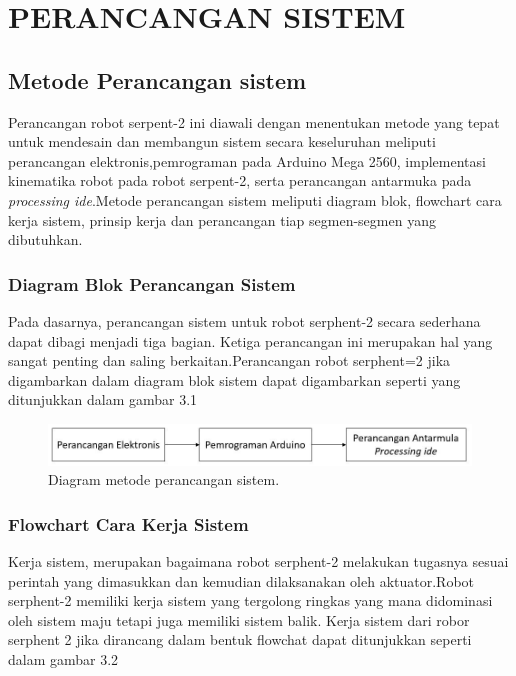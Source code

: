
\chapter{PERANCANGAN SISTEM}

\section{Metode Perancangan sistem}
Perancangan robot serpent-2 ini diawali dengan menentukan metode yang tepat untuk mendesain dan membangun sistem secara keseluruhan meliputi perancangan elektronis,pemrograman pada Arduino Mega 2560, implementasi kinematika robot pada robot serpent-2, serta perancangan antarmuka pada \emph {processing ide}.Metode perancangan sistem meliputi diagram blok, flowchart cara kerja sistem, prinsip kerja dan perancangan tiap segmen-segmen yang dibutuhkan.
\subsection{Diagram Blok Perancangan Sistem}
Pada dasarnya, perancangan sistem untuk robot serphent-2 secara sederhana dapat dibagi menjadi tiga bagian. Ketiga perancangan ini merupakan hal yang sangat penting dan saling berkaitan.Perancangan robot serphent=2 jika digambarkan dalam diagram blok sistem dapat digambarkan seperti yang ditunjukkan dalam gambar 3.1
	\begin{figure}[H]
	\centering
	\includegraphics[width=\linewidth]{001.jpg}
	\caption{Diagram metode perancangan sistem.}
\end{figure}
	
\subsection{Flowchart Cara Kerja Sistem}
Kerja sistem, merupakan bagaimana robot serphent-2 melakukan tugasnya sesuai perintah yang dimasukkan dan kemudian dilaksanakan oleh aktuator.Robot serphent-2 memiliki kerja sistem yang tergolong ringkas yang mana didominasi oleh sistem maju tetapi juga memiliki sistem balik.  Kerja sistem dari robor serphent 2 jika dirancang dalam bentuk flowchat dapat ditunjukkan seperti dalam gambar 3.2

